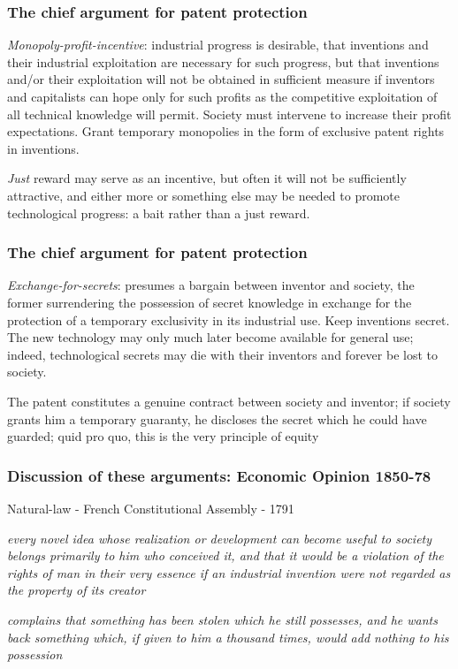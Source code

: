 \begin{frame}
\frametitle{The chief argument for patent protection}
\textit{Monopoly-profit-incentive}: industrial progress is desirable, that inventions and their industrial exploitation are necessary for such progress, but that inventions and/or their exploitation will not be obtained in sufficient measure if inventors and capitalists can hope only for such profits as the competitive exploitation of all technical knowledge will permit. Society must intervene to increase their profit expectations. Grant temporary monopolies in the form of exclusive patent rights in inventions. 

\textit{Just} reward may serve as an incentive, but often it will not be sufficiently attractive, and either more or something else may be needed to promote technological progress: a bait rather than a just reward.
\end{frame}

\begin{frame}
\frametitle{The chief argument for patent protection}
\textit{Exchange-for-secrets}: presumes a bargain between inventor and society, the former surrendering the possession of secret knowledge in exchange for the protection of a temporary exclusivity in its industrial use. Keep inventions secret. The new technology may only much later become available for general use; indeed, technological secrets may die with their inventors and forever be lost to society.

The patent constitutes a genuine contract between society and inventor; if society grants him a temporary guaranty, he discloses the secret which he could have guarded; quid pro quo, this is the very principle of equity
\end{frame}

\begin{frame}
\frametitle{Discussion of these arguments: Economic Opinion 1850-78}
Natural-law - French Constitutional Assembly - 1791

\textit{every novel idea whose realization or development can become useful to society belongs primarily to him who conceived it, and that it would be a violation of the rights of man in their very essence if an industrial invention were not regarded as the property of its creator}

\textit{complains that something has been stolen which he still possesses, and he wants back something which, if given to him a thousand times, would add nothing to his possession}
\end{frame}

